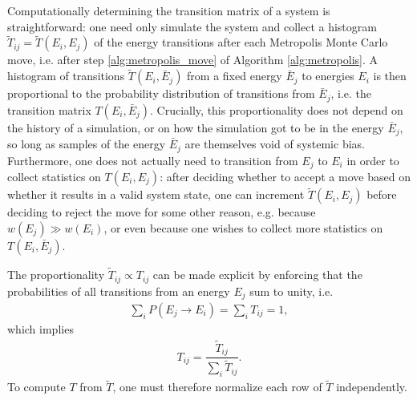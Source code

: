 \documentclass[11pt]{article}
\newcommand{\f}[2]{\dfrac{#1}{#2}} %
\newcommand{\p}[1]{\left(#1\right)} %
\begin{document}
Computationally determining the transition matrix of a system is
straightforward: one need only simulate the system and collect a
histogram $\tilde T_{ij}=\tilde T\p{E_i,E_j}$ of the energy
transitions after each Metropolis Monte Carlo move, i.e. after step
\ref{alg:metropolis_move} of Algorithm \ref{alg:metropolis}. A
histogram of transitions $\tilde T\p{E_i,\bar E_j}$ from a fixed
energy $\bar E_j$ to energies $E_i$ is then proportional to the
probability distribution of transitions from $\bar E_j$, i.e. the
transition matrix $T\p{E_i,\bar E_j}$. Crucially, this proportionality
does not depend on the history of a simulation, or on how the
simulation got to be in the energy $\bar E_j$, so long as samples of
the energy $\bar E_j$ are themselves void of systemic
bias. Furthermore, one does not actually need to transition from $E_j$
to $E_i$ in order to collect statistics on $T\p{E_i,E_j}$: after
deciding whether to accept a move based on whether it results in a
valid system state, one can increment $\tilde T\p{E_i,E_j}$ before
deciding to reject the move for some other reason, e.g. because
$w\p{E_j}\gg w\p{E_i}$, or even because one wishes to collect more
statistics on $T\p{E_i,\bar E_j}$.

The proportionality $\tilde T_{ij}\propto T_{ij}$ can be made explicit
by enforcing that the probabilities of all transitions from an energy
$E_j$ sum to unity, i.e.
\begin{align}
  \sum_iP\p{E_j\to E_i}=\sum_iT_{ij}=1,
  \label{eq:transition_norm_condition}
\end{align}
which implies
\begin{align}
  T_{ij}=\f{\tilde T_{ij}}{\sum_i\tilde T_{ij}}.
  \label{eq:transition_normalization}
\end{align}
To compute $T$ from $\tilde T$, one must therefore normalize each row
of $\tilde T$ independently.
\end{document}
